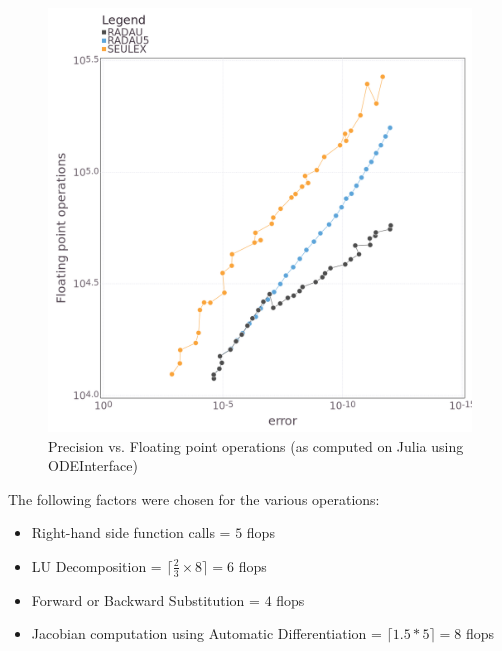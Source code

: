 \documentclass[notitlepage,12pt]{article}
\begin{document}
\begin{figure}[H]
\centering
\includegraphics[scale=0.4]{../ImagesAndPDFs/Plots/RoberPrecisionTestFlops.png}
\caption{Precision vs. Floating point operations (as computed on Julia using ODEInterface)}
\label{fig:roberJulia}
\end{figure}

The following factors were chosen for the various operations:\\
\begin{itemize}
\item Right-hand side function calls = $5$ flops
\item LU Decomposition = $\lceil \frac{2}{3}\times 8\rceil = 6$ flops
\item Forward or Backward Substitution = $4$ flops
\item Jacobian computation using Automatic Differentiation = $\lceil 1.5*5 \rceil = 8$ flops
\end{itemize}




\end{document}
